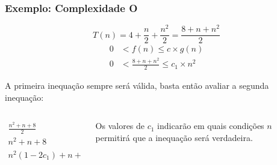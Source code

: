 \documentclass[10pt]{beamer}
\begin{document}
\begin{frame}[fragile, t]
    \frametitle{Exemplo: Complexidade O}
    $$T(n) = 4 + \frac{n}{2}+ \frac{n^2}{2} = \frac{8+n + n^2}{2}$$
    \begin{align*}
        0 & <f(n) \leq c\times g(n)                 \\
        0 & <\frac{8+n + n^2}{2} \leq c_1\times n^2
    \end{align*}

    A primeira inequação sempre será válida, basta então avaliar a segunda inequação:
    \begin{columns}
        \begin{column}{0.5\textwidth}
            \begin{align*}
                \frac{n^2 + n + 8}{2} & \leq c_1n^2  \\
                n^2 + n + 8           & \leq 2c_1n^2 \\
                n^2(1 - 2c_1) + n + 8 & \leq 0
            \end{align*}
        \end{column}
        \begin{column}{0.5\textwidth}
            Os valores de $c_1$ indicarão em quais condições $n$ permitirá que a inequação será verdadeira.
        \end{column}
    \end{columns}

\end{frame}
\end{document}
